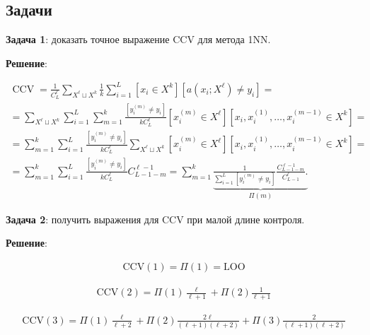 \subsection{Задачи}

\noindent
\textbf{Задача 1}: доказать точное выражение CCV для метода 1NN.

\noindent
\textbf{Решение}:

\begin{equation*}
	\begin{gathered} \operatorname{CCV}=\frac{1}{C_L^{\ell}} \sum_{X^{\ell} \sqcup X^k} \frac{1}{k} \sum_{i=1}^L\left[x_i \in X^k\right]\left[a\left(x_i ; X^{\ell}\right) \neq y_i\right]= \\ =\sum_{X^{\ell} \sqcup X^k} \sum_{i=1}^L \sum_{m=1}^k \frac{\left[y_i^{(m)} \neq y_i\right]}{k C_L^{\ell}}\left[x_i^{(m)} \in X^{\ell}\right]\left[x_i, x_i^{(1)}, \ldots, x_i^{(m-1)} \in X^k\right]= \\ =\sum_{m=1}^k \sum_{i=1}^L \frac{\left[y_i^{(m)} \neq y_i\right]}{k C_L^{\ell}} \sum_{X^{\ell} \sqcup X^k}\left[x_i^{(m)} \in X^{\ell}\right]\left[x_i, x_i^{(1)}, \ldots, x_i^{(m-1)} \in X^k\right]= \\ =\sum_{m=1}^k \sum_{i=1}^L \frac{\left[y_i^{(m)} \neq y_i\right]}{k C_L^{\ell}} C_{L-1-m}^{\ell-1}=\sum_{m=1}^k \underbrace{\frac{1}{\sum_{i=1}^L\left[y_i^{(m)} \neq y_i\right]} \frac{C_{L-1-m}^{\ell-1}}{C_{L-1}^{\ell}} .}_{\Pi(m)} 
	\end{gathered}
\end{equation*}

\noindent
\textbf{Задача 2}: получить выражения для CCV при малой длине контроля.

\noindent
\textbf{Решение}:

\begin{equation*}
	\begin{aligned} 
		\mathrm{CCV(1)}=\Pi(1)=\mathrm{LOO}
	\end{aligned}
\end{equation*}

\begin{equation*}
	\begin{aligned} 
		\mathrm{CCV(2)}=\Pi(1) \frac{\ell}{\ell+1}+\Pi(2) \frac{1}{\ell+1}
	\end{aligned}
\end{equation*}

\begin{equation*}
	\begin{aligned}
		\mathrm{CCV(3)}=\Pi(1) \frac{\ell}{\ell+2}+\Pi(2) \frac{2 \ell}{(\ell+1)(\ell+2)}+\Pi(3) \frac{2}{(\ell+1)(\ell+2)} 
	\end{aligned}
\end{equation*}

